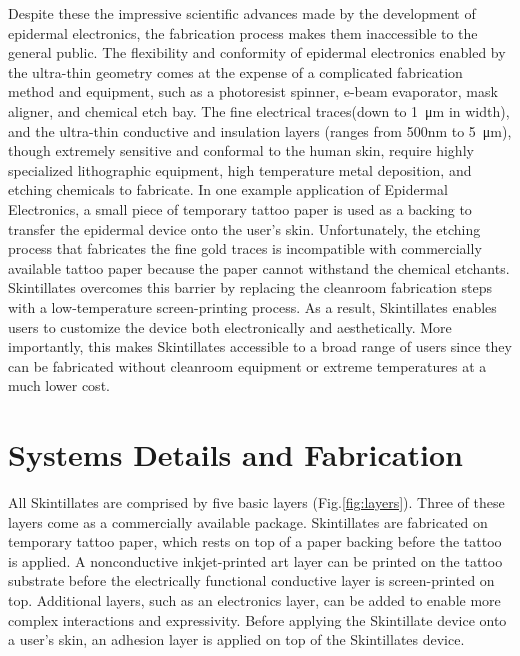 \documentclass{sigchi}
\begin{document}
Despite these the impressive scientific advances made by the development of epidermal electronics, the fabrication process makes them inaccessible to the general public. The flexibility and conformity of epidermal electronics enabled by the ultra-thin geometry comes at the expense of a complicated fabrication method and equipment, such as a photoresist spinner, e-beam evaporator, mask aligner, and chemical etch bay\cite{Kim:2011bv}. The fine electrical traces(down to \SI{1}{\micro\metre} in width), and the ultra-thin conductive and insulation layers (ranges from 500nm to 5\SI{}{\micro\metre}), though extremely sensitive and conformal to the human skin, require highly specialized lithographic equipment, high temperature metal deposition, and etching chemicals to fabricate\cite{Kim:2011bv,Kim:2014iq}. In one example application of Epidermal Electronics, a small piece of temporary tattoo paper is used as a backing to transfer the epidermal device onto the user's skin\cite{Kim:2011bv}. Unfortunately, the etching process that fabricates the fine gold traces is incompatible with commercially available tattoo paper because the paper cannot withstand the chemical etchants. Skintillates overcomes this barrier by replacing the cleanroom fabrication steps with a low-temperature screen-printing process. As a result, Skintillates enables users to customize the device both electronically and aesthetically.  More importantly, this makes Skintillates accessible to a broad range of users since they can be fabricated without cleanroom equipment or extreme temperatures at a much lower cost. 

\section{Systems Details and Fabrication}
 All Skintillates are comprised by five basic layers (Fig.\ref{fig:layers}). Three of these layers come as a commercially available package. Skintillates are fabricated on temporary tattoo paper, which rests on top of a paper backing before the tattoo is applied. A nonconductive inkjet-printed art layer can be printed on the tattoo substrate before the electrically functional conductive layer is screen-printed on top. Additional layers, such as an electronics layer, can be added to enable more complex interactions and expressivity. Before applying the Skintillate device onto a user's skin, an adhesion layer is applied on top of the Skintillates device. 
\end{document}

